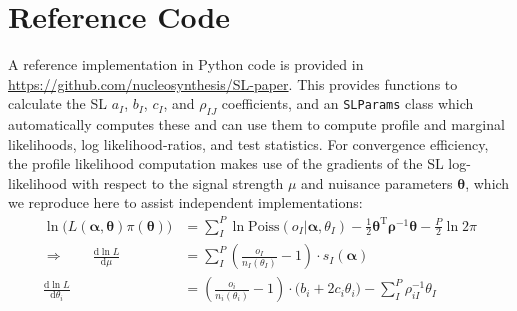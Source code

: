 \section{Reference Code}
\label{sec:reference_code}

A reference implementation in Python code is provided in
\url{https://github.com/nucleosynthesis/SL-paper}.  This provides functions to
calculate the SL $a_I$, $b_I$, $c_I$, and $\rho_{IJ}$ coefficients, and an
\texttt{SLParams} class which automatically computes these and can use them to
compute profile and marginal likelihoods, log likelihood-ratios, and test
statistics. For convergence efficiency, the profile likelihood computation makes
use of the gradients of the SL log-likelihood with respect to the signal
strength $\mu$ and nuisance parameters $\bm{\theta}$, which we reproduce here to
assist independent implementations:
%
\begin{align}
  \ln \big( L(\bm{\alpha},\bm{\theta} )\pi(\bm{\theta}) \big) &=
  \sum_I^P \ln \mathrm{Poiss}(o_I|\bm{\alpha},\theta_I) - \frac{1}{2} \bm{\theta}^\mathrm{T} \bm{\rho}^{-1} \bm{\theta} - \frac{P}{2} \ln 2\pi \\
  \Rightarrow \qquad
  \frac{\mathrm{d}\ln L}{\mathrm{d}\mu} &= \sum_I^P \left( \frac{o_I}{n_I(\theta_I)} - 1 \right) \cdot s_I(\bm{\alpha}) \\
  \frac{\mathrm{d}\ln L}{\mathrm{d}\theta_i} &= \left( \frac{o_i}{n_i(\theta_i)} - 1 \right) \cdot \big( b_i + 2 c_i \theta_i \big) - \sum_I^P \rho_{iI}^{-1} \theta_I
\label{eq:SL_LHC}
\end{align}
